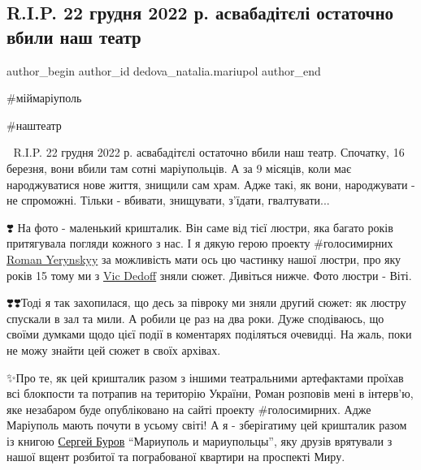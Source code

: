  
 
 
 
 

\subsection{R.I.P. 22 грудня 2022 р. асвабадітєлі остаточно вбили наш театр}
\label{sec:23_12_2022.fb.dedova_natalia.mariupol.2.r_i_p__22_grudnya_20}

\ifcmt
 author_begin
   author_id dedova_natalia.mariupol
 author_end
\fi

\#міймаріуполь

\#наштеатр

🖤 R.I.P. 22 грудня 2022 р. асвабадітєлі остаточно вбили наш театр. Спочатку,
16 березня, вони вбили там сотні маріупольців. А за 9 місяців, коли має
народжуватися нове життя, знищили сам храм. Адже такі, як вони, народжувати -
не спроможні. Тільки - вбивати, знищувати, з'їдати, гвалтувати... 

❣️ На фото - маленький кришталик. Він саме від тієї люстри, яка багато років
притягувала погляди кожного з нас. І я дякую герою проекту \#голосимирних
\href{https://www.facebook.com/roman.ye.1671}{Roman Yerynskyy} за можливість
мати ось цю частинку нашої люстри, про яку років 15 тому ми з
\href{https://www.facebook.com/vic.dedoff}{Vic Dedoff} зняли сюжет. Дивіться
нижче. Фото люстри - Віті.

❣️❣️Тоді я так захопилася, що десь за півроку ми зняли другий сюжет: як люстру
спускали в зал та мили. А робили це раз на два роки. Дуже сподіваюсь, що своїми
думками щодо цієї події в коментарях поділяться очевидці. На жаль, поки не можу
знайти цей сюжет в своїх архівах.

✨Про те, як цей кришталик разом з іншими театральними артефактами проїхав всі
блокпости та потрапив на територію України, Роман розповів мені в інтерв'ю, яке
незабаром буде опубліковано на сайті проекту \#голосимирних. Адже Маріуполь
мають почути в усьому світі! А я - зберігатиму цей кришталик разом із книгою
\href{https://www.facebook.com/profile.php?id=100005851476252}{Сергей Буров}
\enquote{Мариуполь и мариупольцы}, яку друзів врятували з нашої вщент розбитої
та пограбованої квартири на проспекті Миру. 💙💔💛

